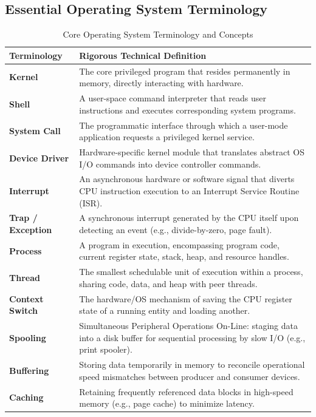 \subsection{Essential Operating System Terminology}
\begin{table}[htbp]
\centering
\small
\caption{Core Operating System Terminology and Concepts}
\label{tab:os_terminologies}
\begin{tabularx}{\textwidth}{l X}
\toprule
\textbf{Terminology} & \textbf{Rigorous Technical Definition} \\
\midrule
\textbf{Kernel} & The core privileged program that resides permanently in memory, directly interacting with hardware. \\
\textbf{Shell} & A user-space command interpreter that reads user instructions and executes corresponding system programs. \\
\textbf{System Call} & The programmatic interface through which a user-mode application requests a privileged kernel service. \\
\textbf{Device Driver} & Hardware-specific kernel module that translates abstract OS I/O commands into device controller commands. \\
\textbf{Interrupt} & An asynchronous hardware or software signal that diverts CPU instruction execution to an Interrupt Service Routine (ISR). \\
\textbf{Trap / Exception} & A synchronous interrupt generated by the CPU itself upon detecting an event (e.g., divide-by-zero, page fault). \\
\textbf{Process} & A program in execution, encompassing program code, current register state, stack, heap, and resource handles. \\
\textbf{Thread} & The smallest schedulable unit of execution within a process, sharing code, data, and heap with peer threads. \\
\textbf{Context Switch} & The hardware/OS mechanism of saving the CPU register state of a running entity and loading another. \\
\textbf{Spooling} & Simultaneous Peripheral Operations On-Line: staging data into a disk buffer for sequential processing by slow I/O (e.g., print spooler). \\
\textbf{Buffering} & Storing data temporarily in memory to reconcile operational speed mismatches between producer and consumer devices. \\
\textbf{Caching} & Retaining frequently referenced data blocks in high-speed memory (e.g., page cache) to minimize latency. \\

\end{tabularx}
\end{table}
